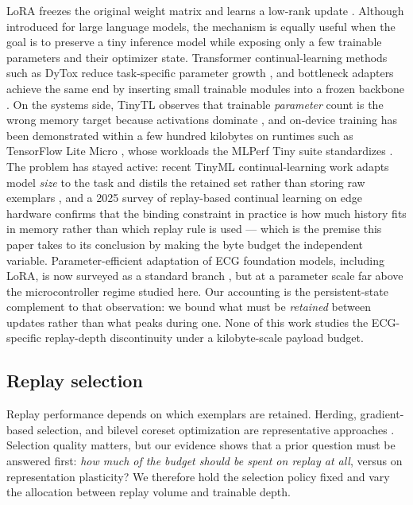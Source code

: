 LoRA freezes the original weight matrix and learns a low-rank update
\cite{hu2022lora}. Although introduced for large language models, the mechanism
is equally useful when the goal is to preserve a tiny inference model while
exposing only a few trainable parameters and their optimizer state. Transformer
continual-learning methods such as DyTox reduce task-specific parameter growth
\cite{douillard2022dytox}, and bottleneck adapters achieve the same end by
inserting small trainable modules into a frozen backbone
\cite{houlsby2019adapters}. On the systems side, TinyTL observes that trainable
\emph{parameter} count is the wrong memory target because activations dominate
\cite{cai2020tinytl}, and on-device training has been demonstrated within a few
hundred kilobytes \cite{lin2022ondevice} on runtimes such as TensorFlow Lite
Micro \cite{david2021tflitemicro}, whose workloads the MLPerf Tiny suite
standardizes \cite{banbury2021mlperftiny}. The problem has stayed active: recent
TinyML continual-learning work adapts model \emph{size} to the task and distils
the retained set rather than storing raw exemplars \cite{ruib2024tinyml}, and a
2025 survey of replay-based continual learning on edge hardware confirms that
the binding constraint in practice is how much history fits in memory rather than
which replay rule is used \cite{replay2025survey} --- which is the premise this
paper takes to its conclusion by making the byte budget the independent variable.
Parameter-efficient adaptation of ECG foundation models, including LoRA, is now
surveyed as a standard branch \cite{ecgfoundation2024survey}, but at a parameter
scale far above the microcontroller regime studied here. Our accounting is the persistent-state
complement to that observation: we bound what must be \emph{retained} between
updates rather than what peaks during one. None of this work studies the
ECG-specific replay-depth discontinuity under a kilobyte-scale payload budget.

\subsection{Replay selection}

Replay performance depends on which exemplars are retained. Herding,
gradient-based selection, and bilevel coreset optimization are representative
approaches \cite{rebuffi2017icarl,tiwari2022gcr,borsos2020coresets}. Selection
quality matters, but our evidence shows that a prior question must be answered
first: \emph{how much of the budget should be spent on replay at all}, versus on
representation plasticity? We therefore hold the selection policy fixed and vary
the allocation between replay volume and trainable depth.

